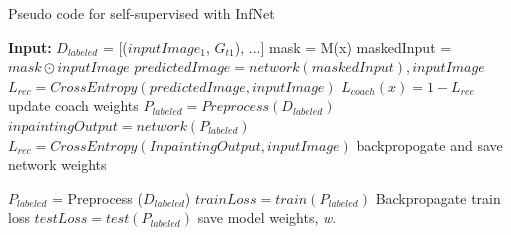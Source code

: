 \begin{algorithm}
	\caption{Pseudo code for self-supervised with InfNet}
	\label{alg:self-inf-net}
	\begin{algorithmic}
		\STATE \textbf{Input:} $D_{labeled}$ = [($inputImage_1$, $G_{t1}$), ...]
		\STATE mask = M(x)
		\STATE maskedInput = $mask \odot inputImage$
		\STATE $ predictedImage =network(maskedInput), inputImage$
		\STATE $L_{rec} = CrossEntropy(predictedImage, inputImage)$
		\STATE $L_{coach}(x) = 1 - L_{rec}$
		\STATE update coach weights
		\ENDFOR
		\STATE $P_{labeled} = Preprocess(D_{labeled})$
		\STATE $inpaintingOutput = network(P_{labeled})$
		\STATE $L_{rec} = CrossEntropy(InpaintingOutput, inputImage)$
		\STATE backpropogate and save network weights
		\ENDFOR
		\ENDFOR 
		
		
		\STATE $P_{labeled}$ = Preprocess ($D_{labeled}$)
		\STATE $trainLoss = train(P_{labeled})$
		\STATE Backpropagate train loss
		\STATE $testLoss = test(P_{labeled})$
		\STATE save model weights, \textit{w}.
		\ENDFOR
	\end{algorithmic}
	\label{alg:infnet}
\end{algorithm}







